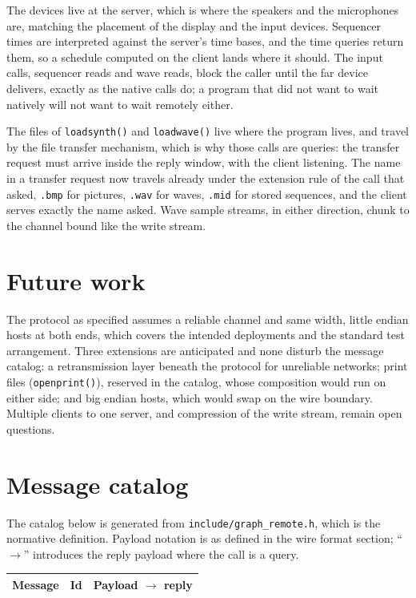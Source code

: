 \documentclass[11pt]{article}
\begin{document}
The devices live at the server, which is where the speakers and the
microphones are, matching the placement of the display and the input
devices. Sequencer times are interpreted against the server's time
bases, and the time queries return them, so a schedule computed on the
client lands where it should. The input calls, sequencer reads and wave
reads, block the caller until the far device delivers, exactly as the
native calls do; a program that did not want to wait natively will not
want to wait remotely either.

The files of \texttt{loadsynth()} and \texttt{loadwave()} live where
the program lives, and travel by the file transfer mechanism, which is
why those calls are queries: the transfer request must arrive inside the
reply window, with the client listening. The name in a transfer request
now travels already under the extension rule of the call that asked,
\texttt{.bmp} for pictures, \texttt{.wav} for waves, \texttt{.mid}
for stored sequences, and the client serves exactly the name asked. Wave
sample streams, in either direction, chunk to the channel bound like the
write stream.

\section{Future work}

The protocol as specified assumes a reliable channel and same width, little
endian hosts at both ends, which covers the intended deployments and the
standard test arrangement. Three extensions are anticipated and none
disturb the message catalog: a retransmission layer beneath the protocol
for unreliable networks; print files (\texttt{openprint()}), reserved in
the catalog, whose composition would run on either side; and big endian
hosts, which would swap on the wire boundary. Multiple clients to one
server, and compression of the write stream, remain open questions.

\section{Message catalog}

The catalog below is generated from \texttt{include/graph\_remote.h},
which is the normative definition. Payload notation is as defined in the
wire format section; ``$\rightarrow$'' introduces the reply payload where
the call is a query.

\begin{longtable}{@{}>{\raggedright\arraybackslash}p{2.4in}r>{\raggedright\arraybackslash}p{3.2in}@{}}
\hline
\textbf{Message} & \textbf{Id} & \textbf{Payload $\rightarrow$ reply} \\
\hline
\endhead

\hline
\end{longtable}
\end{document}
